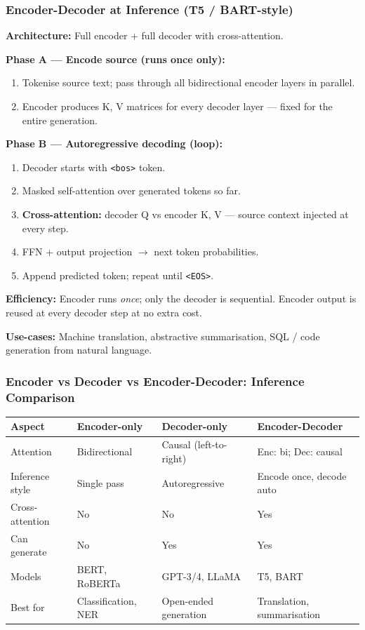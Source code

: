 \begin{frame}[fragile]\frametitle{Encoder-Decoder at Inference (T5 / BART-style)}

\textbf{Architecture:} Full encoder + full decoder with cross-attention.

\textbf{Phase A --- Encode source (runs once only):}
\begin{enumerate}
\item Tokenise source text; pass through all bidirectional encoder layers in parallel.
\item Encoder produces K, V matrices for every decoder layer --- fixed for the entire generation.
\end{enumerate}

\textbf{Phase B --- Autoregressive decoding (loop):}
\begin{enumerate}
\item Decoder starts with \texttt{<bos>} token.
\item Masked self-attention over generated tokens so far.
\item \textbf{Cross-attention:} decoder Q vs encoder K, V --- source context injected at every step.
\item FFN + output projection $\to$ next token probabilities.
\item Append predicted token; repeat until \texttt{<EOS>}.
\end{enumerate}

\textbf{Efficiency:} Encoder runs \emph{once}; only the decoder is sequential. Encoder output is reused at every decoder step at no extra cost.

\textbf{Use-cases:} Machine translation, abstractive summarisation, SQL / code generation from natural language.

\end{frame}

\begin{frame}[fragile]\frametitle{Encoder vs Decoder vs Encoder-Decoder: Inference Comparison}

\begin{center}
\begin{tabular}{|p{2.2cm}|p{2.6cm}|p{2.6cm}|p{2.6cm}|}
\hline
\textbf{Aspect} & \textbf{Encoder-only} & \textbf{Decoder-only} & \textbf{Encoder-Decoder} \\
\hline
Attention & Bidirectional & Causal (left-to-right) & Enc: bi; Dec: causal \\
\hline
Inference style & Single pass & Autoregressive & Encode once, decode auto \\
\hline
Cross-attention & No & No & Yes \\
\hline
Can generate & No & Yes & Yes \\
\hline
Models & BERT, RoBERTa & GPT-3/4, LLaMA & T5, BART \\
\hline
Best for & Classification, NER & Open-ended generation & Translation, summarisation \\
\hline
\end{tabular}
\end{center}

\end{frame}

